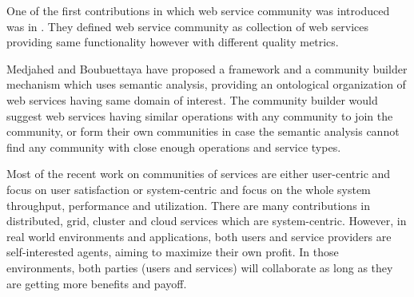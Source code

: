         One of the first contributions in which web service community was introduced was in \cite{Zeng:2003:QDW:775152.775211}. They defined web service community as collection of web services providing same functionality however with different quality metrics.

        Medjahed and Boubuettaya \cite{journals/dpd/MedjahedB05} have proposed a framework and a community builder mechanism which uses semantic analysis, providing an ontological organization of web services having same domain of interest. The community builder would suggest web services having similar operations with any community to join the community, or form their own communities in case the semantic analysis cannot find any community with close enough operations and service types.

        Most of the recent work on communities of services are either
        user-centric and focus on user satisfaction
        \cite{Chun02user-centricperformance} or system-centric and focus
        on the whole system throughput, performance and utilization. There
        are many contributions in distributed, grid, cluster and cloud
        services which are system-centric. However, in real world
        environments and applications, both users and service providers
        are self-interested agents, aiming to maximize their own profit.
        In those environments, both parties (users and services) will
        collaborate as long as they are getting more benefits and payoff.

